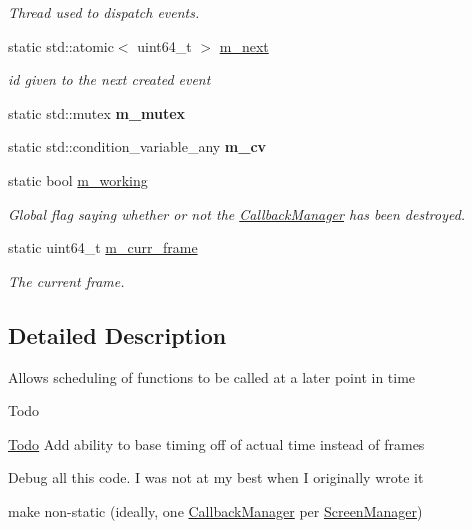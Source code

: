 \begin{DoxyCompactItemize}
\begin{DoxyCompactList}\small\item\em Thread used to dispatch events. \end{DoxyCompactList}\item 
\mbox{\label{classnta_1_1CallbackManager_a714aa329a54538ec5bda528fa3a3ab7f}} 
static std\+::atomic$<$ uint64\+\_\+t $>$ \hyperlink{classnta_1_1CallbackManager_a714aa329a54538ec5bda528fa3a3ab7f}{m\+\_\+next}
\begin{DoxyCompactList}\small\item\em id given to the next created event \end{DoxyCompactList}\item 
\mbox{\label{classnta_1_1CallbackManager_a56903bee3075ab191f598e36438d6b50}} 
static std\+::mutex {\bfseries m\+\_\+mutex}
\item 
\mbox{\label{classnta_1_1CallbackManager_afa5d7642112c791dcfef35d78aff4d09}} 
static std\+::condition\+\_\+variable\+\_\+any {\bfseries m\+\_\+cv}
\item 
\mbox{\label{classnta_1_1CallbackManager_a20cd08f864fd62edbd68f5f309be5c30}} 
static bool \hyperlink{classnta_1_1CallbackManager_a20cd08f864fd62edbd68f5f309be5c30}{m\+\_\+working}
\begin{DoxyCompactList}\small\item\em Global flag saying whether or not the \hyperlink{classnta_1_1CallbackManager}{Callback\+Manager} has been destroyed. \end{DoxyCompactList}\item 
\mbox{\label{classnta_1_1CallbackManager_a69bbc2e4ac29aca06d09b2466b6769c2}} 
static uint64\+\_\+t \hyperlink{classnta_1_1CallbackManager_a69bbc2e4ac29aca06d09b2466b6769c2}{m\+\_\+curr\+\_\+frame}
\begin{DoxyCompactList}\small\item\em The current frame. \end{DoxyCompactList}\end{DoxyCompactItemize}


\subsection{Detailed Description}
Allows scheduling of functions to be called at a later point in time \begin{DoxyRefDesc}{Todo}
\item[\hyperlink{todo__todo000001}{Todo}]Add ability to base timing off of actual time instead of frames 

Debug all this code. I was not at my best when I originally wrote it 

make non-\/static (ideally, one \hyperlink{classnta_1_1CallbackManager}{Callback\+Manager} per \hyperlink{classnta_1_1ScreenManager}{Screen\+Manager}) \end{DoxyRefDesc}


